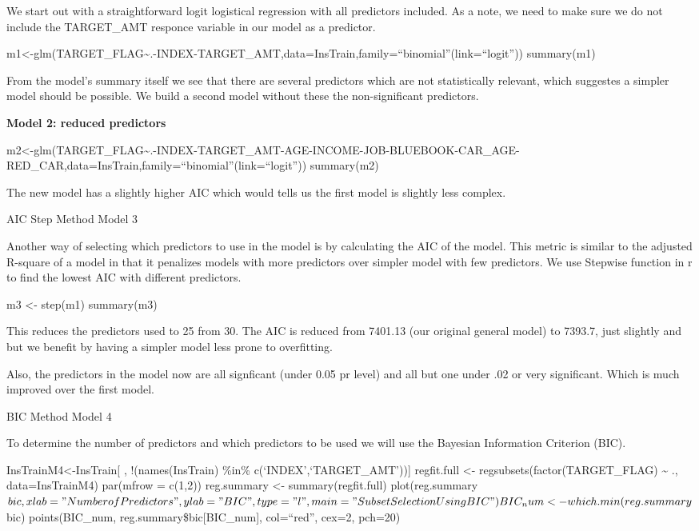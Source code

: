 \documentclass[]{article}
\begin{document}
We start out with a straightforward logit logistical regression with all
predictors included. As a note, we need to make sure we do not include
the TARGET\_AMT responce variable in our model as a predictor.

m1\textless-glm(TARGET\_FLAG\textasciitilde.-INDEX-TARGET\_AMT,data=InsTrain,family=``binomial''(link=``logit''))
summary(m1)

From the model's summary itself we see that there are several predictors
which are not statistically relevant, which suggestes a simpler model
should be possible. We build a second model without these the
non-significant predictors.

\textbf{Model 2: reduced predictors}

m2\textless-glm(TARGET\_FLAG\textasciitilde.-INDEX-TARGET\_AMT-AGE-INCOME-JOB-BLUEBOOK-CAR\_AGE-RED\_CAR,data=InsTrain,family=``binomial''(link=``logit''))
summary(m2)

The new model has a slightly higher AIC which would tells us the first
model is slightly less complex.

AIC Step Method Model 3

Another way of selecting which predictors to use in the model is by
calculating the AIC of the model. This metric is similar to the adjusted
R-square of a model in that it penalizes models with more predictors
over simpler model with few predictors. We use Stepwise function in r to
find the lowest AIC with different predictors.

m3 \textless- step(m1) summary(m3)

This reduces the predictors used to 25 from 30. The AIC is reduced from
7401.13 (our original general model) to 7393.7, just slightly and but we
benefit by having a simpler model less prone to overfitting.

Also, the predictors in the model now are all signficant (under 0.05 pr
level) and all but one under .02 or very significant. Which is much
improved over the first model.

BIC Method Model 4

To determine the number of predictors and which predictors to be used we
will use the Bayesian Information Criterion (BIC).

InsTrainM4\textless-InsTrain{[} , !(names(InsTrain) \%in\%
c(`INDEX',`TARGET\_AMT')){]} regfit.full \textless-
regsubsets(factor(TARGET\_FLAG) \textasciitilde{} ., data=InsTrainM4)
par(mfrow = c(1,2)) reg.summary \textless- summary(regfit.full)
plot(reg.summary\(bic, xlab="Number of Predictors", ylab="BIC", type="l", main="Subset Selection Using BIC") BIC_num <- which.min(reg.summary\)bic)
points(BIC\_num, reg.summary\$bic{[}BIC\_num{]}, col=``red'', cex=2,
pch=20)
\end{document}
